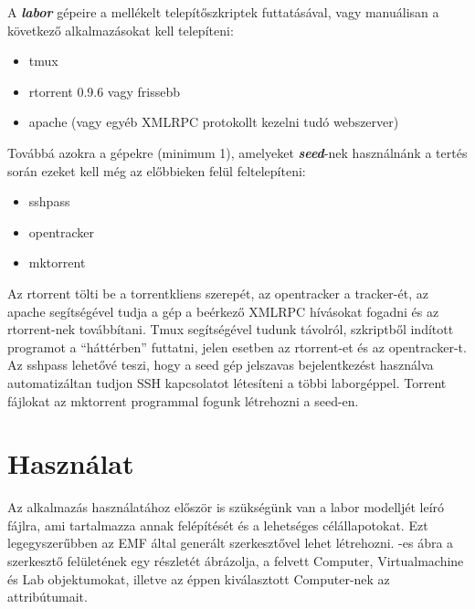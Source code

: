 A \textit{\textbf{labor}} gépeire a mellékelt telepítőszkriptek futtatásával, vagy manuálisan a következő alkalmazásokat kell telepíteni:
\begin{itemize}
  \item tmux
  \item rtorrent 0.9.6 vagy frissebb
  \item apache (vagy egyéb XMLRPC protokollt kezelni tudó webszerver)
\end{itemize}

Továbbá azokra a gépekre (minimum 1), amelyeket \textit{\textbf{seed}}-nek használnánk a tertés során ezeket kell még az előbbieken felül feltelepíteni:
\begin{itemize}
  \item	sshpass
  \item opentracker
  \item mktorrent
\end{itemize}

Az rtorrent tölti be a torrentkliens szerepét, az opentracker a tracker-ét, az apache segítségével tudja a gép a beérkező XMLRPC hívásokat fogadni és az rtorrent-nek továbbítani. Tmux segítségével tudunk távolról, szkriptből indított programot a ``háttérben'' futtatni, jelen esetben az rtorrent-et és az opentracker-t. Az sshpass lehetővé teszi, hogy a seed gép jelszavas bejelentkezést használva automatizáltan tudjon SSH kapcsolatot létesíteni a többi laborgéppel. Torrent fájlokat az mktorrent programmal fogunk létrehozni a seed-en.

\section{Használat}

Az alkalmazás használatához először is szükségünk van a labor modelljét leíró fájlra, ami tartalmazza annak felépítését és a lehetséges célállapotokat. Ezt legegyszerűbben az EMF által generált szerkesztővel lehet létrehozni. -es ábra a szerkesztő felületének egy részletét ábrázolja, a felvett Computer, Virtualmachine és Lab objektumokat, illetve az éppen kiválasztott Computer-nek az attribútumait.

